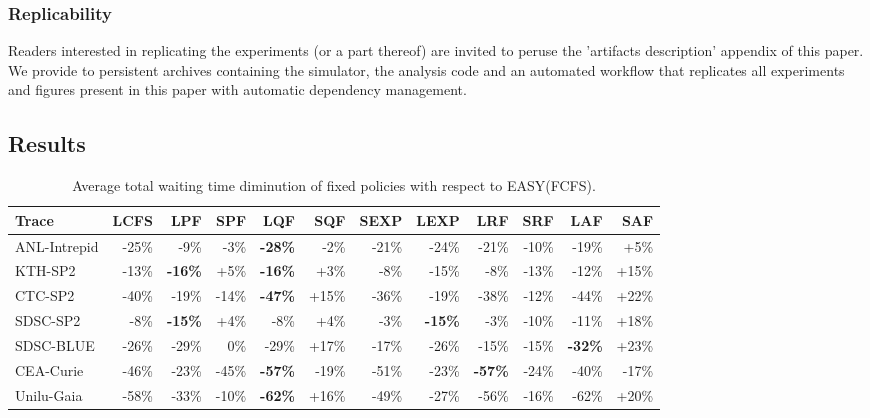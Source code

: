 \documentclass[sigconf,anonymous]{acmart}
\newcommand{\ra}[1]{\renewcommand{\arraystretch}{#1}}
\begin{document}
\subsubsection{Replicability}

Readers interested in replicating the experiments (or a part thereof) are
invited to peruse the 'artifacts description' appendix of this paper. We
provide to persistent archives containing the simulator, the analysis code and
an automated workflow that replicates all experiments and figures present in
this paper with automatic dependency management.

\subsection{Results}
\label{sub:results}

\begin{table}[]
  \centering
  \ra{1.3}
  \caption{Average total waiting time diminution of fixed policies with respect to EASY(FCFS).}


  \label{tab:full}
  \begin{tabular}{@{}lrrrrrrrrrrr@{}}
    \hline
    Trace        & LCFS  & LPF            & SPF   & LQF            & SQF   & SEXP  & LEXP           & LRF            & SRF   & LAF          & SAF   \\
    \hline
    ANL-Intrepid & -25\% & -9\%           & -3\%  & \textbf{-28\%} & -2\%  & -21\% & -24\%          & -21\%          & -10\% & -19\%        & +5\%  \\
    KTH-SP2      & -13\% & \textbf{-16\%} & +5\%  & \textbf{-16\%} & +3\%  & -8\%  & -15\%          & -8\%           & -13\% & -12\%        & +15\% \\
    CTC-SP2      & -40\% & -19\%          & -14\% & \textbf{-47\%} & +15\% & -36\% & -19\%          & -38\%          & -12\% & -44\%        & +22\% \\
    SDSC-SP2     & -8\%  & \textbf{-15\%} & +4\%  & -8\%           & +4\%  & -3\%  & \textbf{-15\%} & -3\%           & -10\% & -11\%        & +18\% \\
    SDSC-BLUE    & -26\% & -29\%          & 0\%   & -29\%          & +17\% & -17\% & -26\%          & -15\%          & -15\% & \textbf{-32\%} & +23\% \\
    CEA-Curie    & -46\% & -23\%          & -45\% & \textbf{-57\%} & -19\% & -51\% & -23\%          & \textbf{-57\%} & -24\% & -40\%        & -17\% \\
    Unilu-Gaia   & -58\% & -33\%          & -10\% & \textbf{-62\%} & +16\% & -49\% & -27\%          & -56\%          & -16\% & -62\%        & +20\% \\
    \hline
  \end{tabular}
\end{table}
\end{document}
